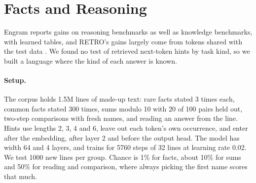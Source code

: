 \documentclass[11pt]{article}
\begin{document}
\section{Facts and Reasoning}\label{sec:facts}
Engram \cite{engram} reports gains on reasoning benchmarks as well as knowledge benchmarks, with learned tables, and RETRO's gains largely come from tokens shared with the test data \cite{norlund}. We found no test of retrieved next-token hints by task kind, so we built a language where the kind of each answer is known.

\paragraph{Setup.} The corpus holds 1.5M lines of made-up text: rare facts stated 3 times each, common facts stated 300 times, sums modulo 10 with 20 of 100 pairs held out, two-step comparisons with fresh names, and reading an answer from the line. Hints use lengths 2, 3, 4 and 6, leave out each token's own occurrence, and enter after the embedding, after layer 2 and before the output head. The model has width 64 and 4 layers, and trains for 5760 steps of 32 lines at learning rate 0.02. We test 1000 new lines per group. Chance is 1\% for facts, about 10\% for sums and 50\% for reading and comparison, where always picking the first name scores that much.

\begin{table}[h]\centering\small
{}
\caption{Accuracy at the answer token.}\label{tab:facts}
\end{table}
\end{document}
